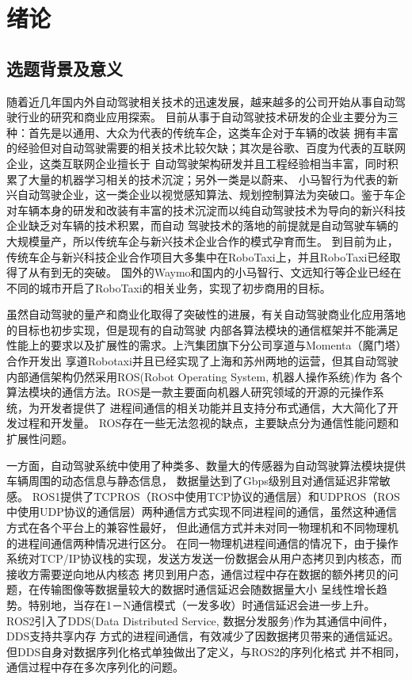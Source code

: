 \chapter{绪论}
\section{选题背景及意义}
随着近几年国内外自动驾驶相关技术的迅速发展，越来越多的公司开始从事自动驾驶行业的研究和商业应用探索\cite{qiuwei}。
目前从事于自动驾驶技术研发的企业主要分为三种：首先是以通用、大众为代表的传统车企，这类车企对于车辆的改装
拥有丰富的经验但对自动驾驶需要的相关技术比较欠缺；其次是谷歌、百度为代表的互联网企业，这类互联网企业擅长于
自动驾驶架构研发并且工程经验相当丰富，同时积累了大量的机器学习相关的技术沉淀；另外一类是以蔚来、
小马智行为代表的新兴自动驾驶企业，这一类企业以视觉感知算法、规划控制算法为突破口\cite{xiaoxi}。鉴于车企
对车辆本身的研发和改装有丰富的技术沉淀而以纯自动驾驶技术为导向的新兴科技企业缺乏对车辆的技术积累，而自动
驾驶技术的落地的前提就是自动驾驶车辆的大规模量产，所以传统车企与新兴技术企业合作的模式孕育而生\cite{yty}。
到目前为止，传统车企与新兴科技企业合作项目大多集中在RoboTaxi上，并且RoboTaxi已经取得了从有到无的突破。
国外的Waymo和国内的小马智行、文远知行等企业已经在不同的城市开启了RoboTaxi的相关业务，实现了初步商用的目标\cite{xmh}。

虽然自动驾驶的量产和商业化取得了突破性的进展，有关自动驾驶商业化应用落地的目标也初步实现，但是现有的自动驾驶
内部各算法模块的通信框架并不能满足性能上的要求以及扩展性的需求。上汽集团旗下分公司享道与Momenta（魔门塔）合作开发出
享道Robotaxi并且已经实现了上海和苏州两地的运营，但其自动驾驶内部通信架构仍然采用ROS(Robot Operating System, 机器人操作系统)作为
各个算法模块的通信方法\cite{zzq}。ROS是一款主要面向机器人研究领域的开源的元操作系统，为开发者提供了
进程间通信的相关功能并且支持分布式通信，大大简化了开发过程和开发量。
ROS存在一些无法忽视的缺点，主要缺点分为通信性能问题和扩展性问题\cite{9545285}。

一方面，自动驾驶系统中使用了种类多、数量大的传感器为自动驾驶算法模块提供车辆周围的动态信息与静态信息，
数据量达到了Gbps级别且对通信延迟非常敏感。
ROS1提供了TCPROS（ROS中使用TCP协议的通信层）和UDPROS（ROS中使用UDP协议的通信层）两种通信方式实现不同进程间的通信，虽然这种通信方式在各个平台上的兼容性最好，
但此通信方式并未对同一物理机和不同物理机的进程间通信两种情况进行区分\cite{8968462}。
在同一物理机进程间通信的情况下，由于操作系统对TCP/IP协议栈的实现，发送方发送一份数据会从用户态拷贝到内核态，而接收方需要逆向地从内核态
拷贝到用户态，通信过程中存在数据的额外拷贝的问题，在传输图像等数据量较大的数据时通信延迟会随数据量大小
呈线性增长趋势。特别地，当存在1－N通信模式（一发多收）时通信延迟会进一步上升\cite{9591166,Maruyama2016ExploringTP}。
ROS2引入了DDS(Data Distributed Service, 数据分发服务)作为其通信中间件\cite{8607261}，DDS支持共享内存
方式的进程间通信，有效减少了因数据拷贝带来的通信延迟。但DDS自身对数据序列化格式单独做出了定义，与ROS2的序列化格式
并不相同，通信过程中存在多次序列化的问题\cite{Maruyama2016ExploringTP}。

